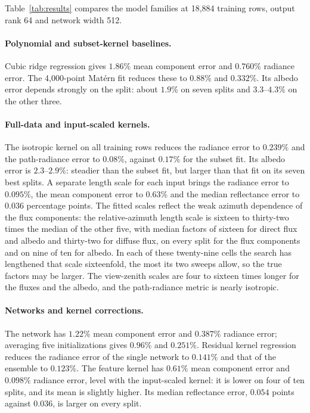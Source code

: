 \documentclass[11pt]{article}
\newcommand{\1}{\mathbf{1}}
\begin{document}
Table~\ref{tab:results} compares the model families at 18{,}884 training rows, output rank
64 and network width 512.

\paragraph{Polynomial and subset-kernel baselines.}
Cubic ridge regression gives $1.86\%$ mean component error and $0.760\%$ radiance error.
The 4{,}000-point Mat\'ern fit reduces these to $0.88\%$ and $0.332\%$. Its albedo error
depends strongly on the split: about $1.9\%$ on seven splits and $3.3$--$4.3\%$ on the other
three.

\paragraph{Full-data and input-scaled kernels.}
The isotropic kernel on all training rows reduces the radiance error to $0.239\%$ and the
path-radiance error to $0.08\%$, against $0.17\%$ for the subset fit. Its albedo error is
$2.3$--$2.9\%$: steadier than the subset fit, but larger than that fit on its seven best
splits. A separate length scale for each input brings the radiance error to $0.095\%$, the mean
component error to $0.63\%$ and the median reflectance error to $0.036$ percentage points. The
fitted scales reflect the weak azimuth dependence of the flux components: the relative-azimuth
length scale is sixteen to thirty-two times the median of the other five, with median factors of
sixteen for direct flux and albedo and thirty-two for diffuse flux, on every split for the flux
components and on nine of ten for albedo. In each of these twenty-nine cells the search has
lengthened that scale sixteenfold, the most its two sweeps allow, so the true factors may be
larger. The view-zenith scales are four to sixteen times longer for the
fluxes and the albedo, and the path-radiance metric is nearly isotropic.

\paragraph{Networks and kernel corrections.}
The network has $1.22\%$ mean component error and $0.387\%$ radiance error; averaging five
initializations gives $0.96\%$ and $0.251\%$. Residual kernel regression reduces the radiance
error of the single network to $0.141\%$ and that of the ensemble to $0.123\%$. The feature
kernel has $0.61\%$ mean component error and $0.098\%$ radiance error, level with the
input-scaled kernel: it is lower on four of ten splits, and its mean is slightly higher. Its
median reflectance error, $0.054$ points against $0.036$, is larger on every split.
\end{document}
